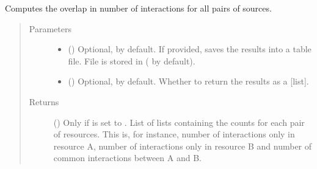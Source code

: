 \documentclass[letterpaper,10pt,english]{sphinxmanual}
\begin{document}
\begin{fulllineitems}
\begin{fulllineitems}
\end{fulllineitems}


\begin{fulllineitems}
\label{\detokenize{reference:pypath.main.PyPath.sources_overlap}}
\end{fulllineitems}


\begin{fulllineitems}
\label{\detokenize{reference:pypath.main.PyPath.sources_venn_data}}
Computes the overlap in number of interactions for all pairs of
sources.
\begin{quote}\begin{description}
\item[{Parameters}] \leavevmode\begin{itemize}
\item {} 
 () \textendash{} Optional,  by default. If provided, saves the
results into a table file. File is stored in
 ( by
default).

\item {} 
 () \textendash{} Optional,  by default. Whether to return the
results as a {[}list{]}.

\end{itemize}

\item[{Returns}] \leavevmode
() \textendash{} Only if  is set to . List
of lists containing the counts for each pair of resources.
This is, for instance, number of interactions only in
resource A, number of interactions only in resource B and
number of common interactions between A and B.


\end{description}
\end{quote}
\end{fulllineitems}
\end{fulllineitems}
\end{document}
